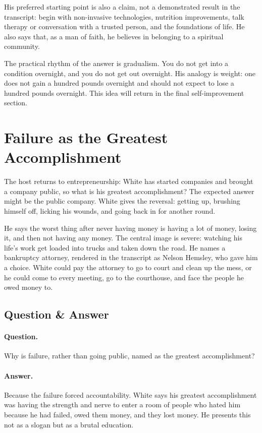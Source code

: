 His preferred starting point is also a claim, not a demonstrated result in the transcript: begin with non-invasive technologies, nutrition improvements, talk therapy or conversation with a trusted person, and the foundations of life. He also says that, as a man of faith, he believes in belonging to a spiritual community.

The practical rhythm of the answer is gradualism. You do not get into a condition overnight, and you do not get out overnight. His analogy is weight: one does not gain a hundred pounds overnight and should not expect to lose a hundred pounds overnight. This idea will return in the final self-improvement section.

\section{Failure as the Greatest Accomplishment}

The host returns to entrepreneurship: White has started companies and brought a company public, so what is his greatest accomplishment? The expected answer might be the public company. White gives the reversal: getting up, brushing himself off, licking his wounds, and going back in for another round.

He says the worst thing after never having money is having a lot of money, losing it, and then not having any money. The central image is severe: watching his life's work get loaded into trucks and taken down the road. He names a bankruptcy attorney, rendered in the transcript as Nelson Hemsley, who gave him a choice. White could pay the attorney to go to court and clean up the mess, or he could come to every meeting, go to the courthouse, and face the people he owed money to.

\subsection{Question \& Answer}

\paragraph{Question.} Why is failure, rather than going public, named as the greatest accomplishment?

\paragraph{Answer.} Because the failure forced accountability. White says his greatest accomplishment was having the strength and nerve to enter a room of people who hated him because he had failed, owed them money, and they lost money. He presents this not as a slogan but as a brutal education.

